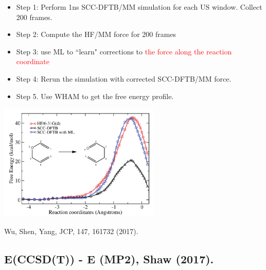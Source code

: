 \documentclass[handout]{beamer} %
\begin{document}
\begin{frame}
\begin{itemize}
\item \scriptsize{Step 1: Perform 1ns SCC-DFTB/MM simulation for each US window.   Collect 200 frames. }
\item Step 2: Compute the HF/MM force for 200 frames
\item Step 3: use ML to ``learn" corrections to \textcolor{red}{the force along the reaction coordinate}
\item Step 4: Rerun the simulation with corrected SCC-DFTB/MM force.   
\item Step 5. Use WHAM to get the free energy profile.  
\end{itemize}
\begin{center}
\includegraphics[height=2.2in]{figures_ml/weitao_claisen_profile2.png}
\end{center}
\vspace{1mm}
\begin{center}
\footnotesize{Wu, Shen, Yang, JCP, 147, 161732 (2017).}
\end{center} 
\end{frame}

\subsection{E(CCSD(T)) - E (MP2), Shaw (2017).}
\end{document}
